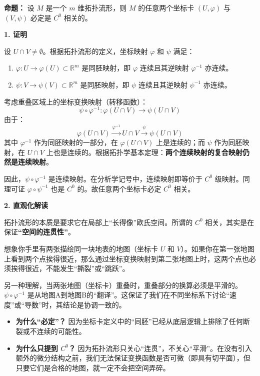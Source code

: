 \begin{myremark}


\textbf{命题：} 设 $M$ 是一个 $m$ 维拓扑流形，则 $M$ 的任意两个坐标卡 $(U, \varphi)$ 与 $(V, \psi)$ 必定是 $C^0$ 相关的。

{\bf 1. 证明}

设 $U \cap V \neq \emptyset$。根据拓扑流形的定义，坐标映射 $\varphi$ 和 $\psi$ 满足：
\begin{enumerate}
    \item $\varphi: U \to \varphi(U) \subset \mathbb{R}^m$ 是同胚映射，即 $\varphi$ 连续且其逆映射 $\varphi^{-1}$ 亦连续。
    \item $\psi: V \to \psi(V) \subset \mathbb{R}^m$ 是同胚映射，即 $\psi$ 连续且其逆映射 $\psi^{-1}$ 亦连续。
\end{enumerate}

考虑重叠区域上的坐标变换映射（转移函数）：
$$
\psi \circ \varphi^{-1}: \varphi(U \cap V) \to \psi(U \cap V)
$$
由于：
$$
\varphi(U \cap V) \xrightarrow{\varphi^{-1}} U \cap V \xrightarrow{\psi} \psi(U \cap V)
$$
其中 $\varphi^{-1}$ 作为同胚映射的一部分，在 $\varphi(U \cap V)$ 上是连续的；而 $\psi$ 作为同胚映射，在 $U \cap V$ 上也是连续的。根据拓扑学基本定理：\textbf{两个连续映射的复合映射仍然是连续映射}。

因此，$\psi \circ \varphi^{-1}$ 是连续映射。在分析学记号中，连续映射即等价于 $C^0$ 级映射。同理可证 $\varphi \circ \psi^{-1}$ 也是 $C^0$ 的。故任意两个坐标卡必定 $C^0$ 相关。

{\bf 2. 直观化解读}

拓扑流形的本质是要求它在局部上“长得像”欧氏空间。所谓的 $C^0$ 相关，其实是在保证\textbf{“空间的连贯性”}。

想象你手里有两张描绘同一块地表的地图（坐标卡 $U$ 和 $V$）。如果你在第一张地图上看到两个点挨得很近，那么通过坐标变换映射到第二张地图上时，这两个点也必须挨得很近，不能发生“撕裂”或“跳跃”。

另一种理解，当两张地图（坐标卡）重叠时，重叠部分的换算必须是平滑的。$\psi \circ \varphi^{-1}$ 是从地图A到地图B的“翻译”。这保证了我们在不同坐标系下讨论“速度”或“导数”时，其结论是协调一致的。

\begin{itemize}
    \item \textbf{为什么“必定”？} 因为坐标卡定义中的“同胚”已经从底层逻辑上排除了任何断裂或不连续的可能性。
    \item \textbf{为什么只提到 $C^0$？} 因为拓扑流形只关心“连贯”，不关心“平滑”。在没有引入额外的微分结构之前，我们无法保证变换函数是否可微（即具有切平面），但只要它们是合格的地图，就一定不会把空间弄碎。
\end{itemize}
\end{myremark}

